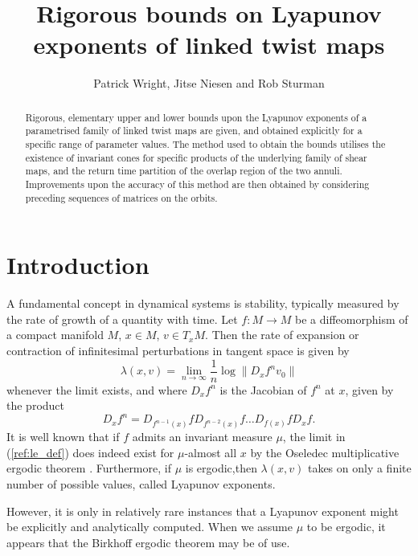 \documentclass{iopart}
\begin{document}
\title[Bounds on Lyapunov exponents of linked twist maps]{Rigorous bounds on Lyapunov exponents of linked twist maps}

\author{Patrick Wright, Jitse Niesen and Rob Sturman}

\address{School of Mathematics, University of Leeds, Leeds, LS2 9JT, UK}
\begin{abstract}
Rigorous, elementary upper and lower bounds upon the Lyapunov exponents of a parametrised family of linked twist maps are given, and obtained explicitly for a specific range of parameter values. The method used to obtain the bounds utilises the existence of invariant cones for specific products of the underlying family of shear maps, and the return time partition of the overlap region of the two annuli. Improvements upon the accuracy of this method are then obtained by considering preceding sequences of matrices on the orbits.
\end{abstract}

\section{Introduction}
A fundamental concept in dynamical systems is stability, typically measured by the rate of growth of a quantity with time. Let $f : M \to M$ be a diffeomorphism of a compact manifold $M$, $x \in M$, $v \in T_x M$. Then the rate of expansion or contraction of infinitesimal perturbations in tangent space is given by
\begin{equation}\label{ref:le_def}
\lambda(x,v) = \lim_{n \to \infty}  \frac{1}{n} \log \| D_x f^n v_0 \|
\end{equation}
whenever the limit exists, and where $D_x f^n$ is the Jacobian of $f^n$ at $x$, given by the product
$$
D_x f^n  = D_{f^{n-1}(x)} f D_{f^{n-2}(x)} f \ldots D_{f(x)} f D_x f.
$$
It is well known that if $f$ admits an invariant measure $\mu$, the limit in (\ref{ref:le_def}) does
indeed exist for $\mu$-almost all $x$ by the Oseledec multiplicative ergodic theorem \cite{Oseledec1968}. Furthermore, if $\mu$ is ergodic,then $\lambda (x,v)$ takes on only a finite number of possible values, called Lyapunov exponents.

However, it is only in relatively rare instances that a Lyapunov exponent might be explicitly and analytically computed. When we assume $\mu$ to be ergodic, it appears that the Birkhoff ergodic theorem may be of use.
\end{document}
